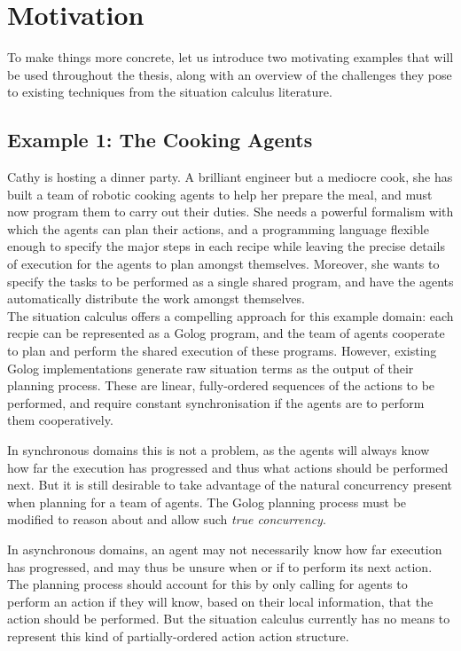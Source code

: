 \section{Motivation}

To make things more concrete, let us introduce two motivating examples
that will be used throughout the thesis, along with an overview of
the challenges they pose to existing techniques from the situation
calculus literature.


\subsection*{Example 1: The Cooking Agents}

Cathy is hosting a dinner party. A brilliant engineer but a mediocre
cook, she has built a team of robotic cooking agents to help her prepare
the meal, and must now program them to carry out their duties. She
needs a powerful formalism with which the agents can plan their actions,
and a programming language flexible enough to specify the major steps
in each recipe while leaving the precise details of execution for
the agents to plan amongst themselves. Moreover, she wants to specify
the tasks to be performed as a single shared program, and have the
agents automatically distribute the work amongst themselves.\\


The situation calculus offers a compelling approach for this example
domain: each recpie can be represented as a Golog program, and the
team of agents cooperate to plan and perform the shared execution
of these programs. However, existing Golog implementations generate
raw situation terms as the output of their planning process. These
are linear, fully-ordered sequences of the actions to be performed,
and require constant synchronisation if the agents are to perform
them cooperatively.

In synchronous domains this is not a problem, as the agents will always
know how far the execution has progressed and thus what actions should
be performed next. But it is still desirable to take advantage of
the natural concurrency present when planning for a team of agents.
The Golog planning process must be modified to reason about and allow
such \emph{true concurrency}.

In asynchronous domains, an agent may not necessarily know how far
execution has progressed, and may thus be unsure when or if to perform
its next action. The planning process should account for this by only
calling for agents to perform an action if they will know, based on
their local information, that the action should be performed. But
the situation calculus currently has no means to represent this kind
of partially-ordered action action structure.\\


